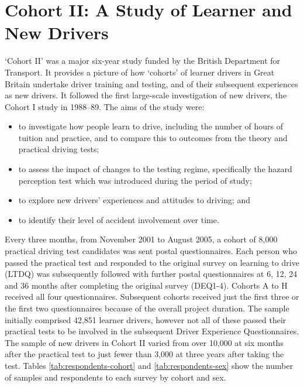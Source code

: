 \documentclass[runningheads]{llncs}
\begin{document}
\section{Cohort II: A Study of Learner and New Drivers}\label{sec:cohortii}
`Cohort II' was a major six-year study funded by the British Department for Transport. It provides a picture of how `cohorts’ of learner drivers in Great Britain undertake driver training and testing, and of their subsequent experiences as new drivers. It followed the first large-scale investigation of new drivers, the Cohort I study in 1988–89. The aims of the study were:
\begin{itemize}[topsep=0pt]
    \item to investigate how people learn to drive, including the number of hours of tuition and practice, and to compare this to outcomes from the theory and practical driving tests;
    \item to assess the impact of changes to the testing regime, specifically the hazard perception test which was introduced during the period of study;
    \item to explore new drivers’ experiences and attitudes to driving; and
    \item to identify their level of accident involvement over time.
\end{itemize}
Every three months, from November 2001 to August 2005, a cohort of 8,000 practical driving test candidates was sent postal questionnaires. Each person who passed the practical test and responded to the original survey on learning to drive (LTDQ) was subsequently followed with further postal questionnaires at 6, 12, 24 and 36 months after completing the original survey (DEQ1-4). Cohorts A to H received all four questionnaires. Subsequent cohorts received just the first three or the first two questionnaires because of the overall project duration.
The sample initially comprised 42,851 learner drivers, however not all of these passed their practical tests to be involved in the subsequent Driver Experience Questionnaires. The sample of new drivers in Cohort II varied from over 10,000 at six months after the practical test to just fewer than 3,000 at three years after taking the test. Tables \ref{tab:respondents-cohort} and \ref{tab:respondents-sex} show the number of samples and respondents to each survey by cohort and sex. 
\vspace{2ex}
\end{document}
